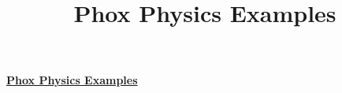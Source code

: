 \documentclass[10pt]{article}
\title{Phox Physics Examples}
\begin{document}
\textbf{\underline{Phox Physics Examples}}\\
\\

\largeskip
\end{document}
